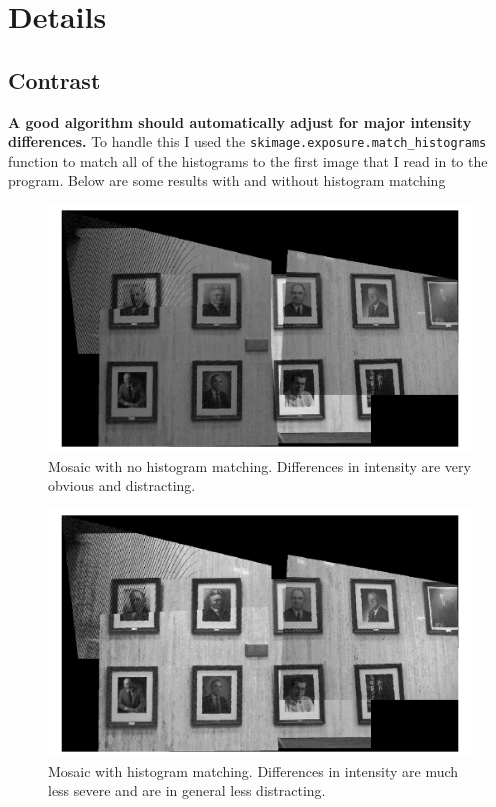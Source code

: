 \documentclass[]{article}
\begin{document}
\section{Details}
	\subsection{Contrast}
	\textbf{A good algorithm should automatically adjust for major intensity differences.}
	\vskip 10pt
	To handle this I used the \texttt{skimage.exposure.match\_histograms} function to match all of the histograms to the first image that I read in to the program. Below are some results with and without histogram matching
	
	\begin{figure}[H]
		\centering
		\includegraphics[width=6.5in]{test_images/no_hist_match.png}
		\caption{Mosaic with no histogram matching. Differences in intensity are very obvious and distracting.}
	\end{figure}
	
	\begin{figure}[H]
		\centering
		\includegraphics[width=6.5in]{test_images/hist_match.png}
		\caption{Mosaic with histogram matching. Differences in intensity are much less severe and are in general less distracting.}
	\end{figure}
	
\end{document}
